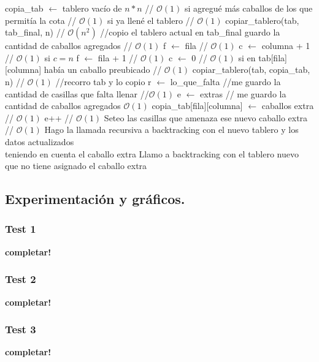 \begin{codebox}
\li copia_tab $\leftarrow$ tablero vacío de $n*n$ // $\mathcal{O}(1)$
\li si agregué más caballos de los que permitía la cota   // $\mathcal{O}(1)$
\li \quad \Return   
\li si ya llené el tablero                                // $\mathcal{O}(1)$
\li \quad copiar_tablero(tab, tab_final, n)               // $\mathcal{O}(n^2)$
\li \quad //copio el tablero actual en tab_final
\li \quad guardo la cantidad de caballos agregados        // $\mathcal{O}(1)$
\li \quad \Return
\li f $\leftarrow$ fila                                   // $\mathcal{O}(1)$
\li c $\leftarrow$ columna + 1                            // $\mathcal{O}(1)$
\li si $c=n$
\li \quad f $\leftarrow$ fila + 1                         // $\mathcal{O}(1)$
\li \quad c $\leftarrow$ 0                                // $\mathcal{O}(1)$
\li si en tab[fila][columna] había un caballo preubicado      // $\mathcal{O}(1)$
\li \quad copiar_tablero(tab, copia_tab, n)              // $\mathcal{O}(1)$
\li \quad //recorro tab y lo copio
\li \quad r $\leftarrow$ lo_que_falta  //me guardo la cantidad de casillas que falta llenar
\li \quad //$\mathcal{O}(1)$
\li \quad e $\leftarrow$ extras  // me guardo la cantidad de caballos agregados $\mathcal{O}(1)$
\li \quad copia_tab[fila][columna] $\leftarrow$ caballos extra        // $\mathcal{O}(1)$
\li \quad e++          // $\mathcal{O}(1)$
\li \quad Seteo las casillas que amenaza ese nuevo caballo extra  // $\mathcal{O}(1)$
\li \quad Hago la llamada recursiva a backtracking con el nuevo tablero y los datos actualizados \\
teniendo en cuenta el caballo extra
\li Llamo a backtracking con el tablero nuevo que no tiene asignado el caballo extra
\end{codebox}



\newpage
\subsection{Experimentación y gráficos.}

\vspace*{0.3cm}

\subsubsection{Test 1}

\vspace*{0.3cm}

\textbf{completar!}


\newpage
\subsubsection{Test 2}

\vspace*{0.3cm}

\textbf{completar!}


\newpage
\subsubsection{Test 3}

\vspace*{0.3cm}

\textbf{completar!}
